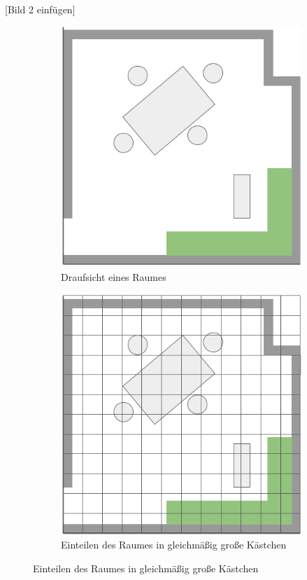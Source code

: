 [Bild 2 einfügen]
\mbox{}
\begin{figure}
  \begin{subfigure}[t]{.3\textwidth}
    \centering
    \includegraphics[width=.8\linewidth]{pic/vorwissen/2a_karte.png}
    \caption{Draufsicht eines Raumes}
  \end{subfigure}\hfill
  \begin{subfigure}[t]{.3\textwidth}
    \centering
    \includegraphics[width=.8\linewidth]{pic/vorwissen/2b_kartengitter.png}
    \caption{Einteilen des Raumes in gleichmäßig große Kästchen}
  \end{subfigure}\hfill

\end{figure}
